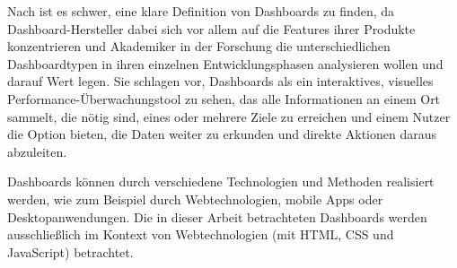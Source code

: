Nach \autocite[S. 44]{Yigitbasioglu.AReviewOfDashboardsInPerformanceManagement.2012} ist es schwer, eine klare Definition von Dashboards zu finden, da Dashboard-Hersteller dabei sich vor allem auf die Features ihrer Produkte konzentrieren und Akademiker in der Forschung die unterschiedlichen Dashboardtypen in ihren einzelnen Entwicklungsphasen analysieren wollen und darauf Wert legen.
Sie schlagen vor, Dashboards als ein interaktives, visuelles Performance-Überwachungstool zu sehen, das alle Informationen an einem Ort sammelt, die nötig sind, eines oder mehrere Ziele zu erreichen und einem Nutzer die Option bieten, die Daten weiter zu erkunden und direkte Aktionen daraus abzuleiten.

Dashboards können durch verschiedene Technologien und Methoden realisiert werden, wie zum Beispiel durch Webtechnologien, mobile Apps oder Desktopanwendungen.
Die in dieser Arbeit betrachteten Dashboards werden ausschließlich im Kontext von Webtechnologien (mit HTML, CSS und JavaScript) betrachtet.


